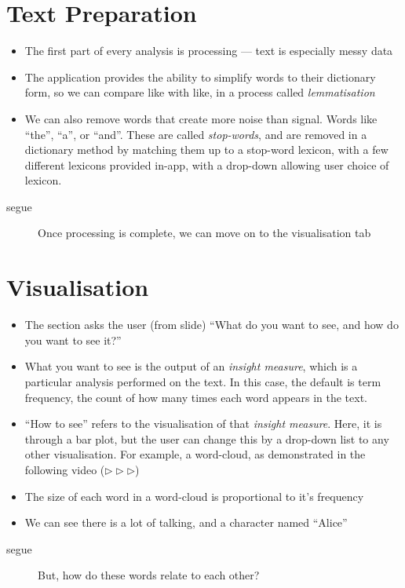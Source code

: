 \documentclass[11pt,a4paper]{article}
\begin{document}
\section{Text Preparation}
\label{sec:text-preparation}
\begin{itemize}
\item The first part of every analysis is processing --- text is
  especially messy data
\item The application provides the ability to simplify words to their
  dictionary form, so we can compare like with like, in a process
  called \textit{lemmatisation}
\item We can also remove words that create more noise than signal.
  Words like ``the'', ``a'', or ``and''. These are called
  \textit{stop-words}, and are removed in a dictionary method by
  matching them up to a stop-word lexicon, with a few different
  lexicons provided in-app, with a drop-down allowing user choice of
  lexicon.
\end{itemize}
\begin{description}
\item[segue] Once processing is complete, we can move on to the
  visualisation tab
\end{description}

\section{Visualisation}
\label{sec:visualisation}
\begin{itemize}
\item The section asks the user (from slide) \enquote{What do you want
    to see, and how do you want to see it?}
\item What you want to see is the output of an \textit{insight
    measure}, which is a particular analysis performed on the text. In
  this case, the default is term frequency, the count of how many
  times each word appears in the text.
\item \enquote{How to see} refers to the visualisation of that
  \textit{insight measure}. Here, it is through a bar plot, but the
  user can change this by a drop-down list to any other visualisation.
  For example, a word-cloud, as demonstrated in the following video
  (\(\triangleright \triangleright \triangleright\))
\item The size of each word in a word-cloud is proportional to it's frequency
\item We can see there is a lot of talking, and a character named \enquote{Alice}
\end{itemize}
\begin{description}
\item[segue] But, how do these words relate to each other?
\end{description}
\end{document}
